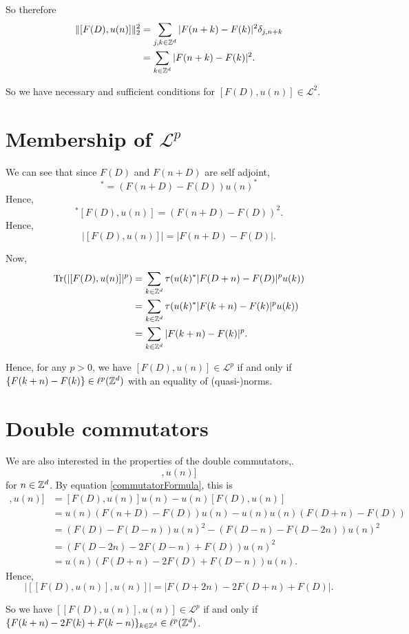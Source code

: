 So therefore
\begin{align}
    \|[F(D),u(n)]\|_{2}^2 &= \sum_{j,k \in \mathbb{Z}^d} |F(n+k)-F(k)|^2 \delta_{j,n+k}\\
                          &= \sum_{k \in \mathbb{Z}^d} |F(n+k)-F(k)|^2.
\end{align}

So we have necessary and sufficient conditions for $[F(D),u(n)] \in \mathcal{L}^2$. 

\section{Membership of $\mathcal{L}^p$}
We can see that since $F(D)$ and $F(n+D)$ are self adjoint, 
\begin{equation}
    [F(D),u(n)]^* = (F(n+D)-F(D))u(n)^*
\end{equation}
Hence,
\begin{equation}
    [F(D),u(n)]^*[F(D),u(n)] = (F(n+D)-F(D))^2.
\end{equation}
Hence,
\begin{equation}
    |[F(D),u(n)]| = |F(n+D)-F(D)|.
\end{equation}

Now,
\begin{align}
    \operatorname{Tr}(|[F(D),u(n)]|^p) &= \sum_{k \in \mathbb{Z}^d} \tau(u(k)^*|F(D+n)-F(D)|^pu(k))\\
    &= \sum_{k \in \mathbb{Z}^d} \tau(u(k)^*|F(k+n)-F(k)|^pu(k))\\
    &= \sum_{k \in \mathbb{Z}^d} |F(k+n)-F(k)|^p.
\end{align}

Hence, for any $p > 0$, we have $[F(D),u(n)] \in \mathcal{L}^p$ if and only if
$\{F(k+n)-F(k)\} \in \ell^p(\mathbb{Z}^d)$ with an equality of (quasi-)norms.


\section{Double commutators}

We are also interested in the properties of the double commutators,.
\begin{equation*}
    [[F(D),u(n)],u(n)]
\end{equation*}
for $n \in \mathbb{Z}^d$. By equation \ref{commutatorFormula}, this is
\begin{align}
    [[F(D),u(n)],u(n)] &= [F(D),u(n)]u(n) - u(n)[F(D),u(n)] \\
                       &= u(n)(F(n+D)-F(D))u(n)-u(n)u(n)(F(D+n)-F(D))\\
                       &= (F(D)-F(D-n))u(n)^2-(F(D-n)-F(D-2n))u(n)^2\\
                       &= (F(D-2n)-2F(D-n)+F(D))u(n)^2\\
                       &= u(n)(F(D+n)-2F(D)+F(D-n))u(n).
\end{align}
Hence,
\begin{equation*}
    |[[F(D),u(n)],u(n)]| = |F(D+2n)-2F(D+n)+F(D)|.
\end{equation*}

So we have $[[F(D),u(n)],u(n)] \in \mathcal{L}^p$
if and only if $\{F(k+n)-2F(k)+F(k-n)\}_{k\in \mathbb{Z}^d} \in \ell^p(\mathbb{Z}^d)$.



